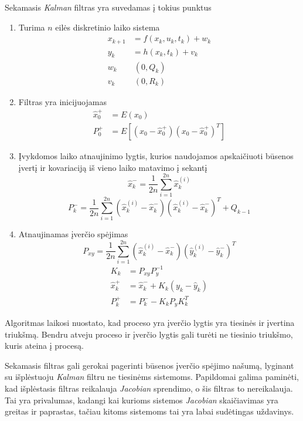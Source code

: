 Sekamasis \textit{Kalman} filtras yra suvedamas į tokius punktus

\begin{enumerate}
    \item Turima $n$ eilės diskretinio laiko sistema
    \begin{equation}
        \begin{aligned}
            x_{k+1} &= f(x_k, u_k, t_k) + w_k \\
            y_k &= h(x_k, t_k) + v_k \\
            w_k &~ (0, Q_k) \\
            v_k &~ (0, R_k)
        \end{aligned}
    \end{equation}
    \item Filtras yra inicijuojamas
    \begin{equation}
        \begin{aligned}
            \hat{x}_0^+ &= E(x_0)\\
            P_0^+ &= E[ (x_0 - \hat{x}_0^+)(x_0 - \hat{x}_0^+)^T ]
        \end{aligned}
    \end{equation}
    \item Įvykdomos laiko atnaujinimo lygtis, kurios naudojamos apskaičiuoti būsenos įvertį ir kovariaciją iš vieno laiko matavimo į sekantį
    \begin{equation}
        \hat{x}_k^- = \frac{1}{2n} \sum_{i=1}^{2n} \hat{x}_k^{(i)}
    \end{equation}
    \begin{equation}
        P_k^- = \frac{1}{2n} \sum_{i=1}^{2n}( \hat{x}_k^{(i)} - \hat{x}_k^- )( \hat{x}_k^{(i)} - \hat{x}_k^- )^T + Q_{k-1}
    \end{equation}
    \item Atnaujinamas įverčio spėjimas
    \begin{equation}
        P_{xy} = \frac{1}{2n}\sum_{i=1}^{2n} (\hat{x}_k^{(i)} - \hat{x}_k^- )( \hat{y}_k^{(i)} - \hat{y}_k^- )^T
    \end{equation}
    \begin{equation}
        \begin{aligned}
            K_k &= P_{xy}P_y^{-1} \\
            \hat{x}_k^+ &= \hat{x}_k^- + K_k(y_k - \hat{y}_k) \\
            P_k^+ &= P_k^- - K_kP_yK_k^T
        \end{aligned}
    \end{equation}
\end{enumerate}

Algoritmas laikosi nuostato, kad proceso yra įverčio lygtis yra tiesinės ir įvertina triukšmą.
Bendru atveju proceso ir įverčio lygtis gali turėti ne tiesinio triukšmo, kuris ateina į procesą.

Sekamasis filtras gali gerokai pagerinti būsenos įverčio spėjimo našumą, lyginant su išplėstuoju \textit{Kalman} filtru ne tiesinėms sistemoms.
Papildomai galima paminėti, kad išplėstasis filtras reikalauja \textit{Jacobian} sprendimo, o šis filtras to nereikalauja.
Tai yra privalumas, kadangi kai kurioms sistemos \textit{Jacobian} skaičiavimas yra greitas ir paprastas, tačiau kitoms sistemoms tai yra labai sudėtingas uždavinys.
